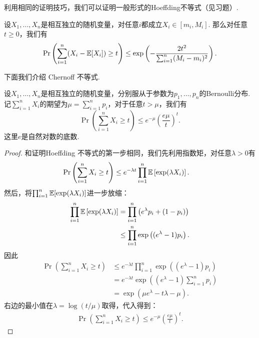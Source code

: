 利用相同的证明技巧，我们可以证明一般形式的Hoeffding不等式（见习题）.

\begin{theorem}\label{thm:hoeffding-inequality-general}
    设$X_1, \dots, X_n$是相互独立的随机变量，对任意$i$都成立$X_i \in [m_i, M_i]$. 那么对任意$t\geq0$，我们有
    \[
        \Pr\left(\sum_{i=1}^n (X_i - \mathbb{E} [X_i]) \geq t\right) \leq \exp \left( - \frac{2t^2}{\sum_{i=1}^n (M_i - m_i)^2}\right).
    \]
\end{theorem}

下面我们介绍 Chernoff 不等式. 
\begin{theorem}\label{thm:chernoff-inequality}
    设$X_1, \dots, X_n$是相互独立的随机变量，分别服从于参数为$p_1, \dots, p_n$的Bernoulli分布.  记$\sum_{i=1}^n X_i$的期望为$\mu = \sum_{i=1}^n p_i$，对于任意$t > \mu$，我们有
    \[
        \Pr\left( \sum_{i=1}^n X_i \geq t\right) \leq e^{-\mu} \left(\frac{e\mu}{t}\right)^t.  
    \]
    这里$e$是自然对数的底数.
\end{theorem}

\begin{proof}
和证明Hoeffding 不等式的第一步相同，我们先利用指数矩，对任意$\lambda > 0$有
    \[
    \begin{aligned}
        \Pr\left( \sum_{i=1}^n X_i \geq t\right) &\leq e^{-\lambda t}\prod_{i=1}^n \mathbb{E}\left[\exp (\lambda X_i)\right].
    \end{aligned}
    \]
然后，将$\prod_{i=1}^n\mathbb{E}[\exp (\lambda X_i)]$进一步放缩：
    \[
    \begin{aligned}
        \prod_{i=1}^n \mathbb{E} \left[\exp (\lambda X_i)\right]&= \prod_{i=1}^n \left(e^\lambda p_i + (1 - p_i) \right) \\
         &\leq \prod_{i=1}^n \exp\left((e^\lambda -1)p_i \right). \\
    \end{aligned}
    \]
因此
    \[
    \begin{aligned}
        \Pr\left( \sum_{i=1}^n X_i \geq t\right) &\leq e^{-\lambda t}\prod_{i=1}^n \exp\left((e^\lambda -1)p_i \right) \\
        &= e^{-\lambda t} \exp\left((e^\lambda -1)\sum_{i=1}^n p_i \right)\\
        &=\exp\left(\mu e^\lambda -t\lambda-\mu \right).
    \end{aligned}
    \]
右边的最小值在$\lambda = \log (t/\mu)$取得，代入得到：
    \[
    \begin{aligned}
        \Pr\left( \sum_{i=1}^n X_i \geq t\right) \leq e^{-\mu} \left(\frac{e\mu}{t}\right)^t.
    \end{aligned}
    \]
\end{proof}

